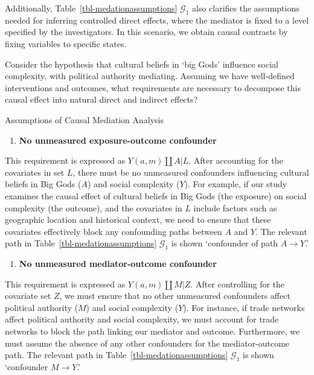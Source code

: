 \documentclass[
  single column]{article}
\providecommand{\tightlist}{%
  \setlength{\itemsep}{0pt}\setlength{\parskip}{0pt}}\usepackage{longtable,booktabs,array}
\begin{document}
Additionally, Table~\ref{tbl-medationassumptions} \(\mathcal{G}_1\) also
clarifies the assumptions needed for inferring controlled direct
effects, where the mediator is fixed to a level specified by the
investigators. In this scenario, we obtain causal contrasts by fixing
variables to specific states.

Consider the hypothesis that cultural beliefs in `big Gods' influence
social complexity, with political authority mediating. Assuming we have
well-defined interventions and outcomes, what requirements are necessary
to decompose this causal effect into natural direct and indirect
effects?

\begin{table}

\caption{\label{tbl-medationassumptions}Assumptions of Causal Mediation
Analysis}

\centering{

\mediationassumptionsswig

}

\end{table}%

\begin{enumerate}
\def\labelenumi{\arabic{enumi}.}
\tightlist
\item
  \textbf{No unmeasured exposure-outcome confounder}
\end{enumerate}

This requirement is expressed as \(Y(a,m) \coprod A | L\). After
accounting for the covariates in set \(L\), there must be no unmeasured
confounders influencing cultural beliefs in Big Gods (\(A\)) and social
complexity (\(Y\)). For example, if our study examines the causal effect
of cultural beliefs in Big Gods (the exposure) on social complexity (the
outcome), and the covariates in \(L\) include factors such as geographic
location and historical context, we need to ensure that these covariates
effectively block any confounding paths between \(A\) and \(Y\). The
relevant path in Table~\ref{tbl-medationassumptions} \(\mathcal{G}_1\)
is shown `confounder of path \(A \to Y\).'

\begin{enumerate}
\def\labelenumi{\arabic{enumi}.}
\setcounter{enumi}{1}
\tightlist
\item
  \textbf{No unmeasured mediator-outcome confounder}
\end{enumerate}

This requirement is expressed as \(Y(a,m) \coprod M | Z\). After
controlling for the covariate set \(Z\), we must ensure that no other
unmeasured confounders affect political authority (\(M\)) and social
complexity (\(Y\)). For instance, if trade networks affect political
authority and social complexity, we must account for trade networks to
block the path linking our mediator and outcome. Furthermore, we must
assume the absence of any other confounders for the mediator-outcome
path. The relevant path in Table~\ref{tbl-medationassumptions}
\(\mathcal{G}_1\) is shown `confounder \(M \to Y\).'
\end{document}
